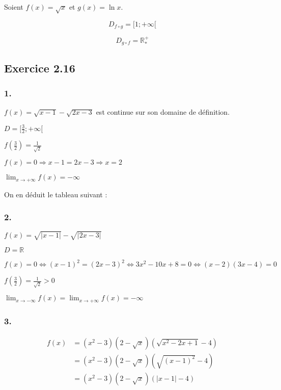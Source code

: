 \documentclass[a4paper,10pt]{report}
\begin{document}
Soient $f(x) = \sqrt{x}$ et $g(x)= \ln x$.

\begin{displaymath}
	D_{f \circ g} = [1 ; +\infty[
\end{displaymath}

\begin{displaymath}
	D_{g \circ f} = \mathbb{R}^{+}_{*}
\end{displaymath}


\subsection*{Exercice 2.16}
\subsubsection*{1.}
$f(x) = \sqrt{x-1} - \sqrt{2x-3}$ est continue sur son domaine de définition.

$D = [\frac{3}{2} ; +\infty[$

$f(\frac{3}{2}) = \frac{1}{\sqrt{2}}$

$f(x) = 0 \Rightarrow x-1 = 2x-3 \Rightarrow x = 2 $

$\lim_{x \rightarrow +\infty} f(x) = -\infty$

On en déduit le tableau suivant :


\subsubsection*{2.}
$f(x) = \sqrt{|x-1|} - \sqrt{|2x-3|}$

$D = \mathbb{R}$

$f(x) = 0 \Longleftrightarrow (x-1)^2 = (2x-3)^2 \Longleftrightarrow 3x^2 -10x +8 =0 \Longleftrightarrow (x-2)(3x-4) =0$

$f(\frac{3}{2}) = \frac{1}{\sqrt{2}} > 0$

$\lim_{x \rightarrow -\infty} f(x) = \lim_{x \rightarrow +\infty} f(x) = -\infty$



\subsubsection*{3.}
\begin{equation*}
	\begin{split}
		f(x) &= (x^2-3)(2-\sqrt{x})(\sqrt{x^2-2x+1}-4) \\
		     &= (x^2-3)(2-\sqrt{x})(\sqrt{(x-1)^2}-4) \\
		     &= (x^2-3)(2-\sqrt{x})(|x-1|-4) \\
	\end{split}
\end{equation*}
\end{document}
